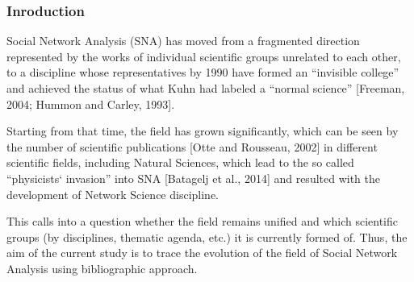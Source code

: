 \documentclass[hyperref={pdfstartview={FitBH -32768},
                         pdfpagemode=FullScreen,
                         plainpages=false,
                         colorlinks=true}
              ]{beamer}
\begin{document}
\begin{frame}[fragile]
\frametitle{Inroduction}
\small

Social Network Analysis (SNA) has moved from a fragmented direction represented by the works of individual scientific groups unrelated to each other, to a discipline whose representatives by 1990 have formed an “invisible college” and achieved the status of  what Kuhn had labeled a “normal science” [Freeman, 2004; Hummon and Carley, 1993]. \medskip

Starting from that time, the field has grown significantly, which can be seen by the number of scientific publications [Otte and Rousseau, 2002] in different scientific fields, including Natural Sciences, which lead to the so called “physicists` invasion” into SNA [Batagelj et al., 2014] and resulted with the development of Network Science discipline. \medskip

This calls into a question whether the field remains unified and which scientific groups (by disciplines, thematic agenda, etc.) it is currently formed of. Thus, the aim of the current study is to trace the evolution of the field of Social Network Analysis using bibliographic approach.  \medskip 

\end{frame}
\end{document}

